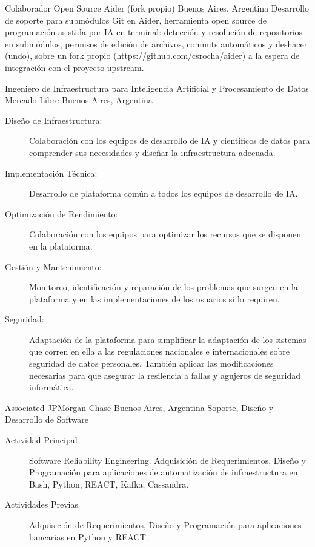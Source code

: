 	{Colaborador Open Source}
	{Aider (fork propio)}
	{Buenos Aires, Argentina}
	{}
	{Desarrollo de soporte para submódulos Git en Aider, herramienta open source de programación asistida por IA en terminal: detección y resolución de repositorios en submódulos, permisos de edición de archivos, commits automáticos y deshacer (undo), sobre un fork propio (https://github.com/csrocha/aider) a la espera de integración con el proyecto upstream.}

	{Ingeniero de Infraestructura para Inteligencia Artificial y Procesamiento de Datos}
	{Mercado Libre}
	{Buenos Aires, Argentina}
	{}
	{\begin{description}
  \item[Diseño de Infraestructura:] Colaboración con los equipos de desarrollo de IA y científicos de datos para comprender sus necesidades y diseñar la infraestructura adecuada.
  \item[Implementación Técnica:] Desarrollo de plataforma común a todos los equipos de desarrollo de IA.
  \item[Optimización de Rendimiento:] Colaboración con los equipos para optimizar los recursos que se disponen en la plataforma.
  \item[Gestión y Mantenimiento:] Monitoreo, identificación y reparación de los problemas que surgen en la plataforma y en las implementaciones de los usuarios si lo requiren.
  \item[Seguridad:] Adaptación de la plataforma para simplificar la adaptación de los sistemas que corren en ella a las regulaciones nacionales e internacionales sobre seguridad de datos personales. También aplicar las modificaciones necesarias para que asegurar la resilencia a fallas y agujeros de seguridad informática.
\end{description}}


	{Associated}
	{JPMorgan Chase}
	{Buenos Aires, Argentina}
	{Soporte, Diseño y Desarrollo de Software}
	{\begin{description}
	\item [Actividad Principal] Software Reliability Engineering. Adquisición de Requerimientos, Diseño y Programación para aplicaciones de automatización de infraestructura en Bash, Python, REACT, Kafka, Cassandra.
	\item [Actividades Previas] Adquisición de Requerimientos, Diseño y Programación para aplicaciones bancarias en Python y REACT.
	\end{description}}

